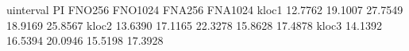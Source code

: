 uinterval   PI    		FNO256  FNO1024 FNA256  FNA1024
kloc1       12.7762     19.1007 27.7549	18.9169 25.8567 
kloc2       13.6390  	17.1165	22.3278 15.8628	17.4878
kloc3       14.1392    	16.5394	20.0946 15.5198	17.3928